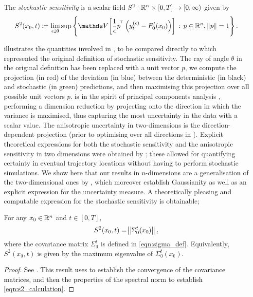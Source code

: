 \begin{definition}\label{def:ss_Rn}
	The \emph{stochastic sensitivity} is a scalar field \(S^2: \mathbb{R}^n \times [0,T] \to \left[0, \infty\right)\) given by
	\begin{equation*}
		S^2\!\left(x_0,t\right) \coloneqq \lim_{\epsilon\downarrow 0}\sup\set{\var{\frac{1}{\epsilon}p^{\T}\left(y_t^{(\epsilon)} - F_0^t\!\left(x_0\right)\right)} \,: \, p \in \R^n, \, \norm{p} = 1}.
	\end{equation*}
\end{definition}

 illustrates the quantities involved in , to be compared directly to  which represented the original definition of stochastic sensitivity.
The ray of angle \(\theta\) in the original definition has been replaced with a unit vector \(p\), we compute the projection (in red) of the deviation (in blue) between the deterministic (in black) and stochastic (in green) predictions, and then maximising this projection over all possible unit vectors \(p\).
 is in the spirit of principal components analysis \citep{Jolliffe_2002_PrincipalComponentAnalysis}, performing a dimension reduction by projecting onto the direction in which the variance is maximised, thus capturing the most uncertainty in the data with a scalar value.
The anisotropic uncertainty in two-dimensions \citep{Balasuriya_2020_StochasticSensitivityComputable} is the direction-dependent projection (prior to optimising over all directions in ).
Explicit theoretical expressions for both the stochastic sensitivity and the anisotropic sensitivity in two dimensions were obtained by \citet{Balasuriya_2020_StochasticSensitivityComputable}; these allowed for quantifying certainty in eventual trajectory locations without having to perform stochastic simulations.
We show here that our results in \(n\)-dimensions are a generalisation of the two-dimensional ones by \citet{Balasuriya_2020_StochasticSensitivityComputable}, which moreover establish Gaussianity as well as an explicit expression for the uncertainty measure.
A theoretically pleasing and computable expression for the stochastic sensitivity is obtainable;


\begin{theorem}[Computation of \(S^2\)]\label{thm:s2_calculation}
	For any \(x_0 \in \mathbb{R}^n\) and \(t \in [0,T]\),
	\begin{equation}
		S^2\!\left(x_0,t\right) = \norm{\Sigma_0^t\!\left(x_0\right)},
		\label{eqn:s2_calculation}
	\end{equation}
	where the covariance matrix \(\Sigma_0^t\) is defined in \cref{eqn:sigma_def}.
	Equivalently, \(S^2\!\left(x_0,t\right)\) is given by the maximum eigenvalue of \(\Sigma_0^t\!\left(x_0\right)\).
\end{theorem}
\begin{proof}
	See .
	This result uses  to establish the convergence of the covariance matrices, and then the properties of the spectral norm to establish \cref{eqn:s2_calculation}.
\end{proof}

